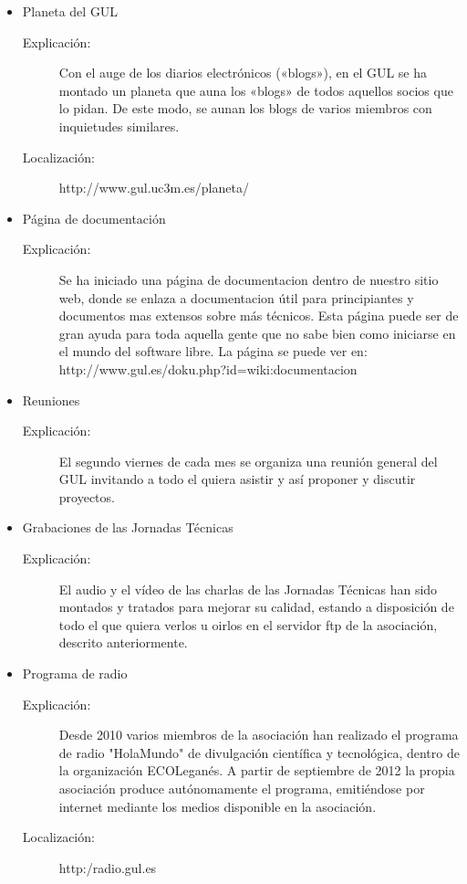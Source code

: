\documentclass[a4paper,12pt]{report}
\begin{document}
\begin{enumerate}
\begin{itemize}
\begin{description}
\end{description}
\item Planeta del GUL
\begin{description}
\item[Explicación:] Con el auge de los diarios electrónicos («blogs»), en
el GUL se ha montado un planeta que auna los «blogs» de todos aquellos
socios que lo pidan. De este modo, se aunan los blogs de varios miembros con inquietudes similares.
\item[Localización:] http://www.gul.uc3m.es/planeta/
\end{description}
\item Página de documentación
\begin{description}
\item[Explicación:] Se ha iniciado una página de documentacion dentro de nuestro
 sitio web, donde se enlaza a documentacion útil para principiantes y documentos
mas extensos sobre más técnicos. Esta página puede ser de gran ayuda para toda aquella gente que no sabe bien como iniciarse en el mundo del software libre.
La página se puede ver en:\\
http://www.gul.es/doku.php?id=wiki:documentacion
\end{description}
\item Reuniones
\begin{description}
\item[Explicación:] El segundo viernes de cada mes se organiza una reunión
general del GUL invitando a todo el quiera asistir y así proponer y discutir
proyectos.
\end{description}
\item Grabaciones de las Jornadas Técnicas
\begin{description}
\item[Explicación:] El audio y el vídeo de las charlas de las Jornadas Técnicas han sido montados y tratados para mejorar su calidad, estando a disposición de todo el que quiera verlos u oirlos en el servidor ftp de la asociación, descrito anteriormente.
\end{description}

\pagebreak
\item Programa de radio
\begin{description}
\item[Explicación:] Desde 2010 varios miembros de la asociación han realizado el programa de radio "HolaMundo" de divulgación científica y tecnológica, dentro de la organización ECOLeganés.
A partir de septiembre de 2012 la propia asociación produce autónomamente el programa, emitiéndose por internet mediante los medios disponible en la asociación.
\item[Localización:] http:/radio.gul.es
\end{description}


\end{itemize}
\end{enumerate}
\end{document}

